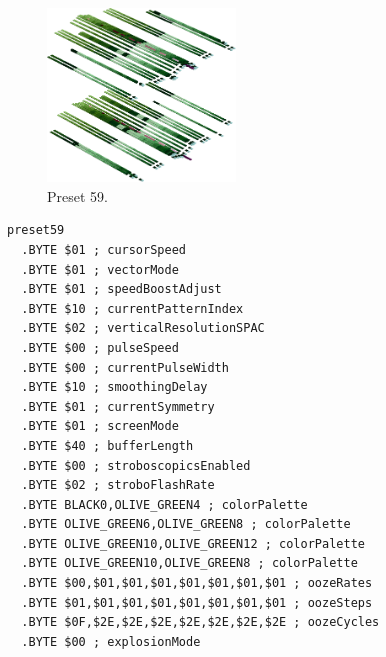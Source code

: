\vspace*{-0.5cm}
\begin{minipage}[b]{0.48\linewidth}
\begin{figure}[H]                                                          
  \centering                                                             
  \begin{adjustbox}{width=5cm,center}                                   
  \includegraphics[width=5cm]{src/colorspace_presets/preset59-45.png}%
  \end{adjustbox}                                                        
\caption*{Preset 59.}                                           
\end{figure}                                                               
\end{minipage}
\hspace{0.1cm}
\begin{minipage}[b]{0.48\linewidth}                                                                         
\begin{lstlisting}[basicstyle=\ttfamily\tiny]
preset59
  .BYTE $01 ; cursorSpeed
  .BYTE $01 ; vectorMode
  .BYTE $01 ; speedBoostAdjust
  .BYTE $10 ; currentPatternIndex
  .BYTE $02 ; verticalResolutionSPAC
  .BYTE $00 ; pulseSpeed
  .BYTE $00 ; currentPulseWidth
  .BYTE $10 ; smoothingDelay
  .BYTE $01 ; currentSymmetry
  .BYTE $01 ; screenMode
  .BYTE $40 ; bufferLength
  .BYTE $00 ; stroboscopicsEnabled
  .BYTE $02 ; stroboFlashRate
  .BYTE BLACK0,OLIVE_GREEN4 ; colorPalette
  .BYTE OLIVE_GREEN6,OLIVE_GREEN8 ; colorPalette
  .BYTE OLIVE_GREEN10,OLIVE_GREEN12 ; colorPalette
  .BYTE OLIVE_GREEN10,OLIVE_GREEN8 ; colorPalette
  .BYTE $00,$01,$01,$01,$01,$01,$01,$01 ; oozeRates
  .BYTE $01,$01,$01,$01,$01,$01,$01,$01 ; oozeSteps
  .BYTE $0F,$2E,$2E,$2E,$2E,$2E,$2E,$2E ; oozeCycles
  .BYTE $00 ; explosionMode
\end{lstlisting}
\end{minipage}



